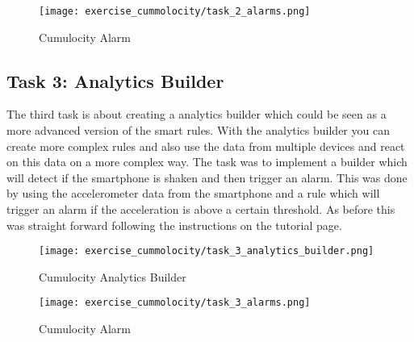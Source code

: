 \begin{figure}[H]
    \centering
    \texttt{[image: exercise\_cummolocity/task\_2\_alarms.png]}
    \caption{Cumulocity Alarm}
    \label{fig:cumulocity_alarm}
\end{figure}

\subsection{Task 3: Analytics Builder}

The third task is about creating a analytics builder which could be seen as a more advanced version of the 
smart rules. With the analytics builder you can create more complex rules and also use the data from multiple 
devices and react on this data on a more complex way.
The task was to implement a builder which will detect if the smartphone is shaken and then trigger an alarm.
This was done by using the accelerometer data from the smartphone and a rule which will trigger an alarm if 
the acceleration is above a certain threshold. As before this was straight forward following the instructions 
on the tutorial page.

\begin{figure}[H]
    \centering
    \texttt{[image: exercise\_cummolocity/task\_3\_analytics\_builder.png]}
    \caption{Cumulocity Analytics Builder}
    \label{fig:cumulocity_analytics_builder}
\end{figure}

\begin{figure}[H]
    \centering
    \texttt{[image: exercise\_cummolocity/task\_3\_alarms.png]}
    \caption{Cumulocity Alarm}
    \label{fig:cumulocity_alarm}
\end{figure}